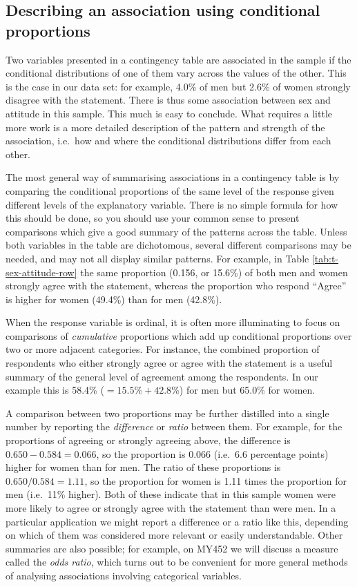 \documentclass[11pt,a4paper,openany]{book}
\begin{document}
\subsection{Describing an association using conditional
proportions}\label{ss-descr1-2cat-descr}

Two variables presented in a contingency table are associated in the
sample if the conditional distributions of one of them vary across the
values of the other. This is the case in our data set: for example,
4.0\% of men but 2.6\% of women strongly disagree with the statement.
There is thus some association between sex and attitude in this sample.
This much is easy to conclude. What requires a little more work is a
more detailed description of the pattern and strength of the
association, i.e.~how and where the conditional distributions differ
from each other.

The most general way of summarising associations in a contingency table
is by comparing the conditional proportions of the same level of the
response given different levels of the explanatory variable. There is no
simple formula for how this should be done, so you should use your
common sense to present comparisons which give a good summary of the
patterns across the table. Unless both variables in the table are
dichotomous, several different comparisons may be needed, and may not
all display similar patterns. For example, in Table
\ref{tab:t-sex-attitude-row} the same proportion (0.156, or 15.6\%) of
both men and women strongly agree with the statement, whereas the
proportion who respond ``Agree'' is higher for women (49.4\%) than for
men (42.8\%).

When the response variable is ordinal, it is often more illuminating to
focus on comparisons of \emph{cumulative} proportions which add up
conditional proportions over two or more adjacent categories. For
instance, the combined proportion of respondents who either strongly
agree or agree with the statement is a useful summary of the general
level of agreement among the respondents. In our example this is 58.4\%
(\(=15.5\%+42.8\%\)) for men but 65.0\% for women.

A comparison between two proportions may be further distilled into a
single number by reporting the \emph{difference} or \emph{ratio} between
them. For example, for the proportions of agreeing or strongly agreeing
above, the difference is \(0.650-0.584=0.066\), so the proportion is
0.066 (i.e.~6.6 percentage points) higher for women than for men. The
ratio of these proportions is \(0.650/0.584=1.11\), so the proportion
for women is 1.11 times the proportion for men (i.e.~11\% higher). Both
of these indicate that in this sample women were more likely to agree or
strongly agree with the statement than were men. In a particular
application we might report a difference or a ratio like this, depending
on which of them was considered more relevant or easily understandable.
Other summaries are also possible; for example, on MY452 we will discuss
a measure called the \emph{odds ratio}, which turns out to be convenient
for more general methods of analysing associations involving categorical
variables.
\end{document}
